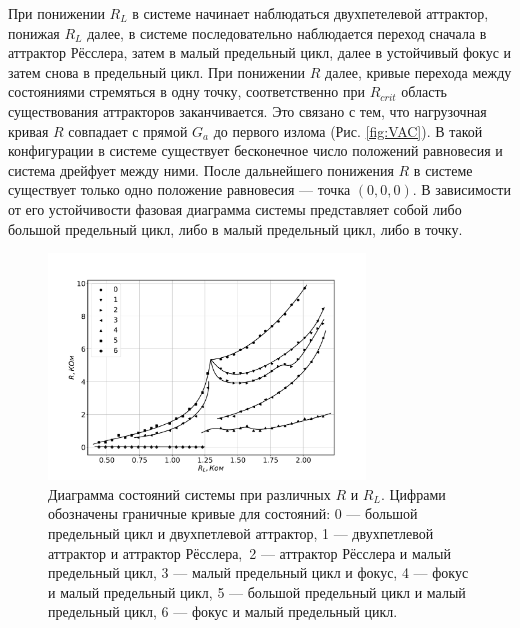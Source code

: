 \documentclass[12pt]{article}
\begin{document}
При понижении $R_L$ в системе начинает наблюдаться двухпетелевой аттрактор, понижая $R_L$ далее, в системе последовательно
наблюдается переход сначала в аттрактор Рёсслера, затем в малый предельный цикл, далее в устойчивый фокус и затем снова в предельный цикл.
При понижении $R$ далее, кривые перехода между состояниями стремяться в одну точку, соответственно при $R_{crit}$ область существования аттракторов
заканчивается. Это связано с тем, что нагрузочная кривая $R$ совпадает с прямой $G_a$ до первого излома (Рис. \ref{fig:VAC}).
В такой конфигурации в системе существует бесконечное число положений равновесия и система дрейфует между ними.
После дальнейшего понижения $R$ в системе существует только одно положение равновесия --- точка $(0, 0, 0)$. В зависимости от его
устойчивости фазовая диаграмма системы представляет собой либо большой предельный цикл, либо в малый предельный цикл, либо в точку.


\begin{figure}[H]
	\centering
	\includegraphics[width=0.75\textwidth]{bif_diag_teor.pdf}
	\caption{Диаграмма состояний системы при различных $R$ и $R_L$.
		Цифрами обозначены граничные кривые для состояний:
		0 --- большой предельный цикл и двухпетлевой аттрактор,
		1 --- двухпетлевой аттрактор и аттрактор Рёсслера,\
		2 --- аттрактор Рёсслера и малый предельный цикл,
		3 --- малый предельный цикл и фокус,
		4 --- фокус и малый предельный цикл,
		5 --- большой предельный цикл и малый предельный цикл,
		6 --- фокус и малый предельный цикл.}
	\label{fig:phase_diag_teor}
\end{figure}
\end{document}
